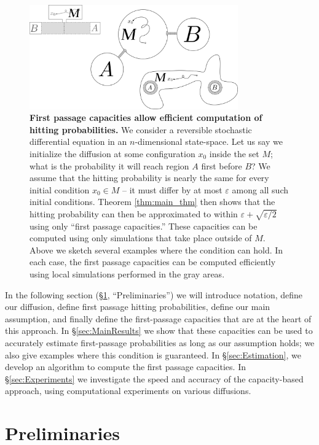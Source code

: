 \documentclass[12pt, nofootinbib,english, amsmath, amssymb, aps, priprint, graphicx,floatfix,draft]{revtex4-1}
\theoremstyle{plain}
\theoremstyle{definition}
\theoremstyle{plain}
\begin{document}
\begin{figure}
    \centering  \includegraphics[width=0.8\textwidth]{bigpicture.png}
    \caption{\footnotesize\linespread{1.}\selectfont{} {\bf First passage capacities allow efficient computation of hitting probabilities.} We consider a reversible stochastic differential equation in an $n$-dimensional state-space.  Let us say we initialize the diffusion at some configuration $x_0$ inside the set $M$; what is the probability it will reach region $A$ first before $B$?  We assume that the hitting probability is nearly the same for every initial condition $x_0 \in M$ -- it must differ by at most $\varepsilon$ among all such initial conditions.  Theorem \ref{thm:main_thm} then shows that the hitting probability can then be approximated to within $\varepsilon + \sqrt{\varepsilon/2}$ using only ``first passage capacities.'' These capacities can be computed using only simulations that take place outside of $M$.  Above we sketch several examples where the condition can hold.  In each case, the first passage capacities can be computed efficiently using local simulations performed in the gray areas.}
\label{fig:ToyModel}
\end{figure}

In the following section (\S\ref{sec:Preliminaries}, ``Preliminaries'') we will introduce notation, define our diffusion, define first passage hitting probabilities, define our main assumption, and finally define the first-passage capacities that are at the heart of this approach.  In \S\ref{sec:MainResults} we show that these capacities can be used to accurately estimate first-passage probabilities as long as our assumption holds; we also give examples where this condition is guaranteed.  In \S\ref{sec:Estimation}, we develop an algorithm to compute the first passage capacities.   In \S\ref{sec:Experiments} we investigate the speed and accuracy of the capacity-based approach, using computational experiments on various diffusions.

\section{Preliminaries}
\label{sec:Preliminaries}
\end{document}
